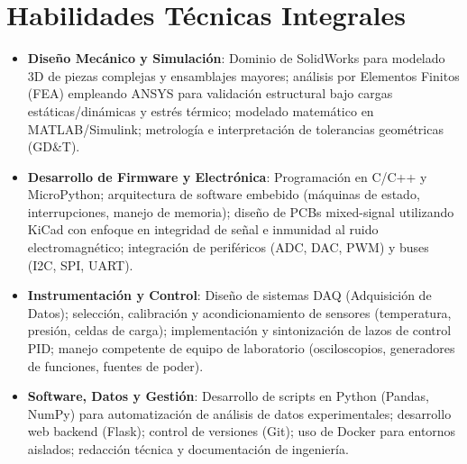 \documentclass[10pt,letterpaper]{article}
\newcommand{\CVItem}[1]{\item #1}
\begin{document}
\section*{Habilidades Técnicas Integrales}
\begin{itemize}[leftmargin=*, itemsep=0.2ex]
    \CVItem{\textbf{Diseño Mecánico y Simulación}: Dominio de SolidWorks para modelado 3D de piezas complejas y ensamblajes mayores; análisis por Elementos Finitos (FEA) empleando ANSYS para validación estructural bajo cargas estáticas/dinámicas y estrés térmico; modelado matemático en MATLAB/Simulink; metrología e interpretación de tolerancias geométricas (GD\&T).}
    \CVItem{\textbf{Desarrollo de Firmware y Electrónica}: Programación en C/C++ y MicroPython; arquitectura de software embebido (máquinas de estado, interrupciones, manejo de memoria); diseño de PCBs mixed-signal utilizando KiCad con enfoque en integridad de señal e inmunidad al ruido electromagnético; integración de periféricos (ADC, DAC, PWM) y buses (I2C, SPI, UART).}
    \CVItem{\textbf{Instrumentación y Control}: Diseño de sistemas DAQ (Adquisición de Datos); selección, calibración y acondicionamiento de sensores (temperatura, presión, celdas de carga); implementación y sintonización de lazos de control PID; manejo competente de equipo de laboratorio (osciloscopios, generadores de funciones, fuentes de poder).}
    \CVItem{\textbf{Software, Datos y Gestión}: Desarrollo de scripts en Python (Pandas, NumPy) para automatización de análisis de datos experimentales; desarrollo web backend (Flask); control de versiones (Git); uso de Docker para entornos aislados; redacción técnica y documentación de ingeniería.}
\end{itemize}
\end{document}
